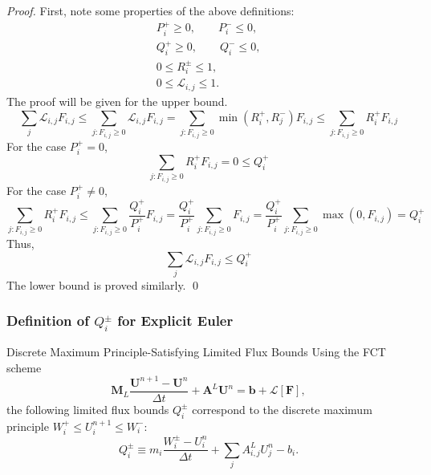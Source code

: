 \begin{proof}
   First, note some properties of the above definitions:
   \begin{gather*}
      P_i^+ \geq 0, \qquad P_i^- \leq 0,\\
      Q_i^+ \geq 0, \qquad Q_i^- \leq 0,\\
      0 \leq R_i^\pm \leq 1,\\
      0 \leq \mathcal{L}_{i,j} \leq 1.
   \end{gather*}
   The proof will be given for the upper bound.
   \[
      \sum\limits_j \mathcal{L}_{i,j}F_{i,j}
         \leq \sum\limits_{j:F_{i,j}\geq 0} \mathcal{L}_{i,j}F_{i,j}
         = \sum\limits_{j:F_{i,j}\geq 0} \min(R_i^+,R_j^-)F_{i,j}
         \leq \sum\limits_{j:F_{i,j}\geq 0} R_i^+ F_{i,j}
   \]
   For the case $P_i^+ = 0$,
   \[
      \sum\limits_{j:F_{i,j}\geq 0} R_i^+ F_{i,j} = 0 \leq Q_i^+
   \]
   For the case $P_i^+ \ne 0$,
   \[
      \sum\limits_{j:F_{i,j}\geq 0} R_i^+ F_{i,j}
      \leq \sum\limits_{j:F_{i,j}\geq 0}\frac{Q_i^+}{P_i^+} F_{i,j}
      = \frac{Q_i^+}{P_i^+} \sum\limits_{j:F_{i,j}\geq 0} F_{i,j}
      = \frac{Q_i^+}{P_i^+} \sum\limits_{j:F_{i,j}\geq 0} \max(0,F_{i,j})
      = Q_i^+
   \]
   Thus,
   \[
      \sum\limits_j \mathcal{L}_{i,j}F_{i,j} \leq Q_i^+
   \]
   The lower bound is proved similarly.
   \qed
\end{proof}
\subsubsection{Definition of $Q_i^\pm$ for Explicit Euler}
\begin{theorem}{Discrete Maximum Principle-Satisfying Limited Flux Bounds}
   Using the FCT scheme
   \begin{equation}\label{FCTscheme}
      \mathbf{M}_L\frac{\mathbf{U}^{n+1}-\mathbf{U}^n}{\Delta t}
         + \mathbf{A}^L\mathbf{U}^n
         = \mathbf{b} + \mathcal{L}[\mathbf{F}],
   \end{equation}
   the following limited flux bounds $Q_i^\pm$ correspond to the discrete
   maximum principle $W_i^+\le U_i^{n+1}\le W_i^-$:
   \begin{equation}\label{Q_ex}
      Q_i^\pm \equiv m_i\frac{W_i^\pm-U_i^n}{\Delta t}
      + \sum\limits_j A_{i,j}^L U_j^n - b_i.
   \end{equation}
\end{theorem}


